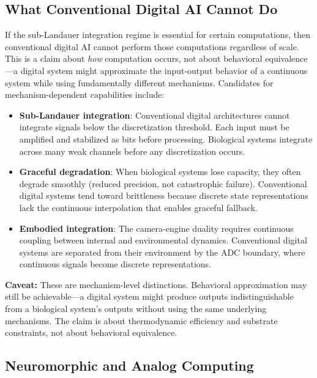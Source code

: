 \documentclass[12pt]{article}
\numberwithin{equation}{section}
\begin{document}
\subsection{What Conventional Digital AI Cannot Do}

If the sub-Landauer integration regime is essential for certain computations, then conventional digital AI cannot perform those computations regardless of scale. This is a claim about \emph{how} computation occurs, not about behavioral equivalence---a digital system might approximate the input-output behavior of a continuous system while using fundamentally different mechanisms. Candidates for mechanism-dependent capabilities include:

\begin{itemize}
\item \textbf{Sub-Landauer integration}: Conventional digital architectures cannot integrate signals below the discretization threshold. Each input must be amplified and stabilized as bits before processing. Biological systems integrate across many weak channels before any discretization occurs.

\item \textbf{Graceful degradation}: When biological systems lose capacity, they often degrade smoothly (reduced precision, not catastrophic failure). Conventional digital systems tend toward brittleness because discrete state representations lack the continuous interpolation that enables graceful fallback.

\item \textbf{Embodied integration}: The camera-engine duality requires continuous coupling between internal and environmental dynamics. Conventional digital systems are separated from their environment by the ADC boundary, where continuous signals become discrete representations.
\end{itemize}

\textbf{Caveat:} These are mechanism-level distinctions. Behavioral approximation may still be achievable---a digital system might produce outputs indistinguishable from a biological system's outputs without using the same underlying mechanisms. The claim is about thermodynamic efficiency and substrate constraints, not about behavioral equivalence.

\subsection{Neuromorphic and Analog Computing}
\label{sec:neuromorphic}
\end{document}
